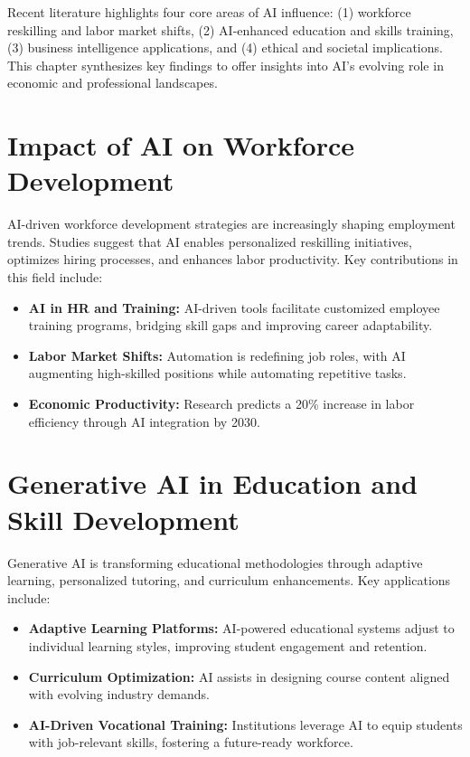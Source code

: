 \documentclass[a4paper,headinclude=on,footinclude=on,12pt,oneside]{scrbook}
\begin{document}
Recent literature highlights four core areas of AI influence: (1) workforce reskilling and labor market shifts, (2) AI-enhanced education and skills training, (3) business intelligence applications, and (4) ethical and societal implications. This chapter synthesizes key findings to offer insights into AI’s evolving role in economic and professional landscapes.

\section{Impact of AI on Workforce Development}

AI-driven workforce development strategies are increasingly shaping employment trends. Studies suggest that AI enables personalized reskilling initiatives, optimizes hiring processes, and enhances labor productivity. Key contributions in this field include:
\begin{itemize}
	\item \textbf{AI in HR and Training:} AI-driven tools facilitate customized employee training programs, bridging skill gaps and improving career adaptability.
	\item \textbf{Labor Market Shifts:} Automation is redefining job roles, with AI augmenting high-skilled positions while automating repetitive tasks.
	\item \textbf{Economic Productivity:} Research predicts a 20\% increase in labor efficiency through AI integration by 2030.
\end{itemize}

\section*{Generative AI in Education and Skill Development}

Generative AI is transforming educational methodologies through adaptive learning, personalized tutoring, and curriculum enhancements. Key applications include:
\begin{itemize}
	\item \textbf{Adaptive Learning Platforms:} AI-powered educational systems adjust to individual learning styles, improving student engagement and retention.
	\item \textbf{Curriculum Optimization:} AI assists in designing course content aligned with evolving industry demands.
	\item \textbf{AI-Driven Vocational Training:} Institutions leverage AI to equip students with job-relevant skills, fostering a future-ready workforce.
\end{itemize}
\end{document}
